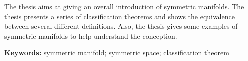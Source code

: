The thesis aims at giving an overall introduction of symmetric
manifolds. The thesis presents a series of classification theorems and
shows the equivalence between several different definitions. Also, the
thesis gives some examples of symmetric manifolds to help understand
the conception.

\bigskip

\noindent
\textbf{Keywords:} symmetric manifold; symmetric space; classification theorem
